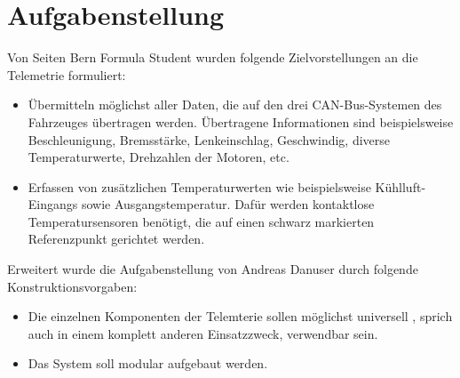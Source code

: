 \chapter{Aufgabenstellung}
\label{chap:aufgabenstellung}

Von Seiten Bern Formula Student wurden folgende Zielvorstellungen an die Telemetrie formuliert:

\begin{itemize}
\itemsep 1pt \parskip 0pt \parsep 0pt
\item Übermitteln möglichst aller Daten, die auf den drei CAN-Bus-Systemen des Fahrzeuges übertragen werden. Übertragene Informationen sind beispielsweise Beschleunigung, Bremsstärke, Lenkeinschlag, Geschwindig, diverse Temperaturwerte, Drehzahlen der Motoren, etc.

\item Erfassen von zusätzlichen Temperaturwerten wie beispielsweise Kühlluft-Eingangs sowie Ausgangstemperatur. Dafür werden kontaktlose Temperatursensoren benötigt, die auf einen schwarz markierten Referenzpunkt gerichtet werden.

\end{itemize}

Erweitert wurde die Aufgabenstellung von Andreas Danuser durch folgende Konstruktionsvorgaben:

\begin{itemize}
\itemsep 1pt \parskip 0pt \parsep 0pt
\item Die einzelnen Komponenten der Telemterie sollen möglichst universell , sprich auch in einem komplett anderen Einsatzzweck, verwendbar sein.
\item Das System soll modular aufgebaut werden.

\end{itemize}
